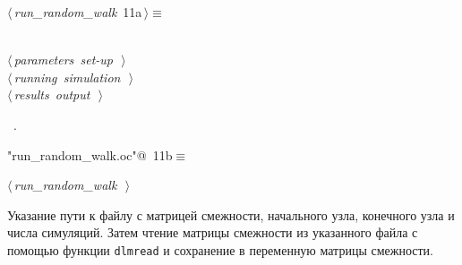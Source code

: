 \documentclass{article}
\begin{document}
\begin{flushleft} \small
\begin{minipage}{\linewidth}\label{scrap13}\raggedright\small
{} $\langle\,${\itshape run_random_walk}\nobreak\ {\footnotesize {11a}}$\,\rangle\equiv$
\vspace{-1ex}
\begin{list}{}{} \item
\mbox{}\verb@@\\
\mbox{}\verb@@\hbox{$\langle\,${\itshape parameters set-up}\nobreak\ {\footnotesize {}}$\,\rangle$}\verb@@\\
\mbox{}\verb@@\hbox{$\langle\,${\itshape running simulation}\nobreak\ {\footnotesize {}}$\,\rangle$}\verb@@\\
\mbox{}\verb@@\hbox{$\langle\,${\itshape results output}\nobreak\ {\footnotesize {}}$\,\rangle$}\verb@@\\
\mbox{}\verb@@{\NWsep}
\end{list}
\vspace{-1.5ex}
\footnotesize
\begin{list}{}{\setlength{\itemsep}{-\parsep}\setlength{\itemindent}{-\leftmargin}}
\item \NWtxtMacroRefIn\ .

\item{}
\end{list}
\end{minipage}\vspace{4ex}
\end{flushleft}
\begin{flushleft} \small
\begin{minipage}{\linewidth}\label{scrap14}\raggedright\small
{} \verb@"run_random_walk.oc"@\nobreak\ {\footnotesize {11b}}$\equiv$
\vspace{-1ex}
\begin{list}{}{} \item
\mbox{}\verb@@\hbox{$\langle\,${\itshape run_random_walk}\nobreak\ {\footnotesize {}}$\,\rangle$}\verb@@{\NWsep}
\end{list}
\vspace{-1.5ex}
\footnotesize
\begin{list}{}{\setlength{\itemsep}{-\parsep}\setlength{\itemindent}{-\leftmargin}}

\item{}
\end{list}
\end{minipage}\vspace{4ex}
\end{flushleft}
Указание пути к файлу с матрицей смежности, начального узла, конечного узла и числа симуляций. Затем чтение матрицы смежности из указанного файла с помощью функции \texttt{dlmread} и сохранение в переменную матрицы смежности.
\end{document}
